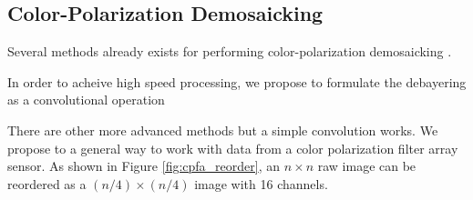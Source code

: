 \subsection*{Color-Polarization Demosaicking}
Several methods already exists for performing color-polarization demosaicking \cite{morimatsuMonochromeColorPolarization2020}\cite{morimatsuMonochromeColorPolarization2021}\cite{nguyenTwoStepColorPolarizationDemosaicking2022a}.




In order to acheive high speed processing, we propose to formulate the debayering as a convolutional operation


There are other more advanced methods but a simple convolution works.
We propose to a general way to work with data from a color polarization filter array sensor.
As shown in Figure \ref{fig:cpfa_reorder}, an $n \times n$ raw image can be reordered as a $(n/4) \times (n/4) $ image with 16 channels.





